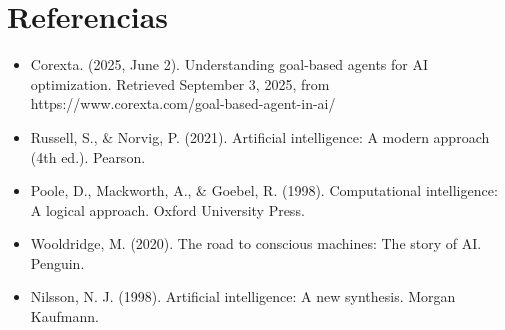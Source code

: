 \documentclass[letterpaper,12pt,oneside]{article}
\begin{document}
\section{Referencias}
\begin{itemize}
    \item Corexta. (2025, June 2). Understanding goal-based agents for AI optimization. Retrieved September 3, 2025, from https://www.corexta.com/goal-based-agent-in-ai/
    \item Russell, S., \& Norvig, P. (2021). Artificial intelligence: A modern approach (4th ed.). Pearson.
    \item Poole, D., Mackworth, A., \& Goebel, R. (1998). Computational intelligence: A logical approach. Oxford University Press.
    \item Wooldridge, M. (2020). The road to conscious machines: The story of AI. Penguin.
    \item Nilsson, N. J. (1998). Artificial intelligence: A new synthesis. Morgan Kaufmann.
\end{itemize}
\end{document}
